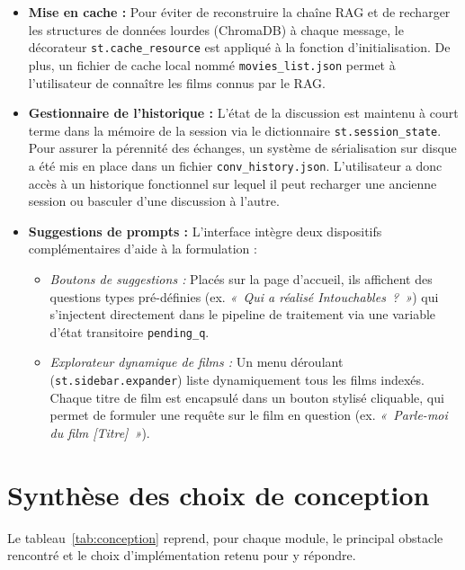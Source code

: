 \documentclass[11pt]{report}
\begin{document}
    \begin{itemize}
        \item \textbf{Mise en cache :}  Pour éviter de reconstruire la chaîne RAG et de recharger les structures de données lourdes (ChromaDB) à chaque message, le décorateur \texttt{st.cache\_resource} est appliqué à la fonction d'initialisation.  De plus, un fichier de cache local nommé \texttt{movies\_list.json} permet à l'utilisateur de connaître les films connus par le RAG.

        \item \textbf{Gestionnaire de l'historique :} L'état de la discussion est maintenu à court terme dans la mémoire de la session via le dictionnaire \texttt{st.session\_state}. 
        Pour assurer la pérennité des échanges, un système de sérialisation sur disque a été mis en place dans un fichier \texttt{conv\_history.json}. L'utilisateur a donc accès à un historique fonctionnel sur lequel il peut recharger une ancienne session ou basculer d'une discussion à l'autre.

        \item \textbf{Suggestions de prompts :} L'interface intègre deux dispositifs complémentaires d'aide à la formulation :
        \begin{itemize}
            \item \textit{Boutons de suggestions :} Placés sur la page d'accueil, ils affichent des questions types pré-définies (ex. \textit{«~Qui a réalisé Intouchables~?~»}) qui s'injectent directement dans le pipeline de traitement via une variable d'état transitoire \texttt{pending\_q}.
            \item \textit{Explorateur dynamique de films :} Un menu déroulant (\texttt{st.sidebar.expander}) liste dynamiquement tous les films indexés. Chaque titre de film est encapsulé dans un bouton stylisé cliquable, qui permet de formuler une requête sur le film en question (ex. \textit{«~Parle-moi du film [Titre]~»}).
        \end{itemize}
    \end{itemize}

    \section{Synthèse des choix de conception}
    \label{sec:conception}

    Le tableau~\ref{tab:conception} reprend, pour chaque module, le principal obstacle rencontré et le choix d'implémentation retenu pour y répondre.
    
\end{document}
